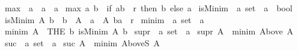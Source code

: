 \begin{isabellebody}
\ max{}\ {\isacharcolon}{\kern0pt}{\isacharcolon}{\kern0pt}\ {\isachardoublequoteopen}{\isacharprime}{\kern0pt}a\ {\isasymRightarrow}\ {\isacharprime}{\kern0pt}a\ {\isasymRightarrow}\ {\isacharprime}{\kern0pt}a{\isachardoublequoteclose}\isanewline
{}\ {\isachardoublequoteopen}max{}\ a\ b\ {\isasymequiv}\ if\ {\isacharparenleft}{\kern0pt}a{\isacharcomma}{\kern0pt}b{\isacharparenright}{\kern0pt}\ {\isasymin}\ r\ then\ b\ else\ a{\isachardoublequoteclose}\isanewline
\isanewline
{}\isamarkupfalse%
\ isMinim\ {\isacharcolon}{\kern0pt}{\isacharcolon}{\kern0pt}\ {\isachardoublequoteopen}{\isacharprime}{\kern0pt}a\ set\ {\isasymRightarrow}\ {\isacharprime}{\kern0pt}a\ {\isasymRightarrow}\ bool{\isachardoublequoteclose}\isanewline
{}\ {\isachardoublequoteopen}isMinim\ A\ b\ {\isasymequiv}\ b\ {\isasymin}\ A\ {\isasymand}\ {\isacharparenleft}{\kern0pt}{\isasymforall}a\ {\isasymin}\ A{\isachardot}{\kern0pt}\ {\isacharparenleft}{\kern0pt}b{\isacharcomma}{\kern0pt}a{\isacharparenright}{\kern0pt}\ {\isasymin}\ r{\isacharparenright}{\kern0pt}{\isachardoublequoteclose}\isanewline
\isanewline
{}\isamarkupfalse%
\ minim\ {\isacharcolon}{\kern0pt}{\isacharcolon}{\kern0pt}\ {\isachardoublequoteopen}{\isacharprime}{\kern0pt}a\ set\ {\isasymRightarrow}\ {\isacharprime}{\kern0pt}a{\isachardoublequoteclose}\isanewline
{}\ {\isachardoublequoteopen}minim\ A\ {\isasymequiv}\ THE\ b{\isachardot}{\kern0pt}\ isMinim\ A\ b{\isachardoublequoteclose}\isanewline
\isanewline
{}\isamarkupfalse%
\ supr\ {\isacharcolon}{\kern0pt}{\isacharcolon}{\kern0pt}\ {\isachardoublequoteopen}{\isacharprime}{\kern0pt}a\ set\ {\isasymRightarrow}\ {\isacharprime}{\kern0pt}a{\isachardoublequoteclose}\isanewline
{}\ {\isachardoublequoteopen}supr\ A\ {\isasymequiv}\ minim\ {\isacharparenleft}{\kern0pt}Above\ A{\isacharparenright}{\kern0pt}{\isachardoublequoteclose}\isanewline
\isanewline
{}\isamarkupfalse%
\ suc\ {\isacharcolon}{\kern0pt}{\isacharcolon}{\kern0pt}\ {\isachardoublequoteopen}{\isacharprime}{\kern0pt}a\ set\ {\isasymRightarrow}\ {\isacharprime}{\kern0pt}a{\isachardoublequoteclose}\isanewline
{}\ {\isachardoublequoteopen}suc\ A\ {\isasymequiv}\ minim\ {\isacharparenleft}{\kern0pt}AboveS\ A{\isacharparenright}{\kern0pt}{\isachardoublequoteclose}%
\isadelimdocument
%
\endisadelimdocument
%
\isatagdocument
%
\isamarkuptrue%
%
\endisatagdocument
{\isafolddocument}%
%
\isadelimdocument

\end{isabellebody}
